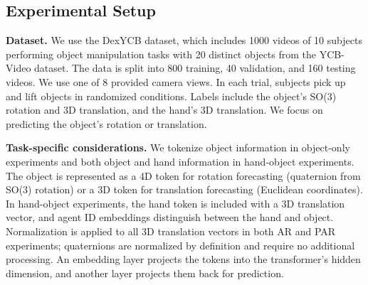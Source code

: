 \subsection{Experimental Setup}
\noindent \textbf{Dataset.} We use the DexYCB dataset, which includes 1000 videos of 10 subjects performing object manipulation tasks with 20 distinct objects from the YCB-Video dataset. The data is split into 800 training, 40 validation, and 160 testing videos. We use one of 8 provided camera views. In each trial, subjects pick up and lift objects in randomized conditions. Labels include the object's SO(3) rotation and 3D translation, and the hand's 3D translation. We focus on predicting the object's rotation or translation.

\medskip \noindent \textbf{Task-specific considerations.} We tokenize object information in object-only experiments and both object and hand information in hand-object experiments. The object is represented as a 4D token for rotation forecasting (quaternion from SO(3) rotation) or a 3D token for translation forecasting (Euclidean coordinates). In hand-object experiments, the hand token is included with a 3D translation vector, and agent ID embeddings distinguish between the hand and object. 
Normalization is applied to all 3D translation vectors in both AR and PAR experiments; quaternions are normalized by definition and require no additional processing. 
An embedding layer projects the tokens into the transformer's hidden dimension, and another layer projects them back for prediction. 

